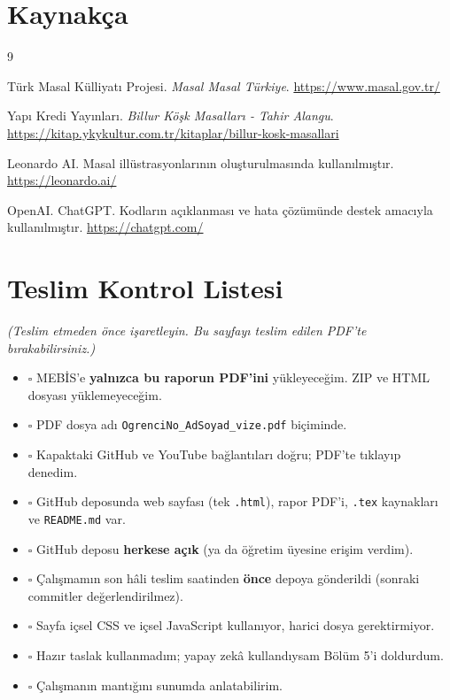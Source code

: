 \documentclass[12pt,a4paper]{article}
\newcommand{\aciklama}[1]{{\color{gray}\itshape (#1)}}
\begin{document}
\section{Kaynakça}

\begin{thebibliography}{9}

 Türk Masal Külliyatı Projesi.
\emph{Masal Masal Türkiye}.
\url{https://www.masal.gov.tr/}

 Yapı Kredi Yayınları.
\emph{Billur Köşk Masalları - Tahir Alangu}.
\url{https://kitap.ykykultur.com.tr/kitaplar/billur-kosk-masallari}

 Leonardo AI.
Masal illüstrasyonlarının oluşturulmasında kullanılmıştır.
\url{https://leonardo.ai/}

 OpenAI. ChatGPT.
Kodların açıklanması ve hata çözümünde destek amacıyla kullanılmıştır.
\url{https://chatgpt.com/}

\end{thebibliography}

\appendix
\section{Teslim Kontrol Listesi}
\aciklama{Teslim etmeden önce işaretleyin. Bu sayfayı teslim edilen PDF'te bırakabilirsiniz.}
\begin{itemize}[label={}]
  \item $\square$ MEBİS'e \textbf{yalnızca bu raporun PDF'ini} yükleyeceğim. ZIP ve HTML dosyası yüklemeyeceğim.
  \item $\square$ PDF dosya adı \texttt{OgrenciNo\_AdSoyad\_vize.pdf} biçiminde.
  \item $\square$ Kapaktaki GitHub ve YouTube bağlantıları doğru; PDF'te tıklayıp denedim.
  \item $\square$ GitHub deposunda web sayfası (tek \texttt{.html}), rapor PDF'i, \texttt{.tex} kaynakları ve \texttt{README.md} var.
  \item $\square$ GitHub deposu \textbf{herkese açık} (ya da öğretim üyesine erişim verdim).
  \item $\square$ Çalışmamın son hâli teslim saatinden \textbf{önce} depoya gönderildi (sonraki commitler değerlendirilmez).
  \item $\square$ Sayfa içsel CSS ve içsel JavaScript kullanıyor, harici dosya gerektirmiyor.
  \item $\square$ Hazır taslak kullanmadım; yapay zekâ kullandıysam Bölüm 5'i doldurdum.
  \item $\square$ Çalışmanın mantığını sunumda anlatabilirim.
\end{itemize}
\end{document}
